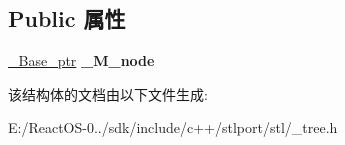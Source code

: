 \subsection*{Public 属性}
\begin{DoxyCompactItemize}
\item 
\mbox{\label{struct___rb__tree__base__iterator_a26e271e3b15ca15b2839134cb9c04bbf}} 
\hyperlink{struct___rb__tree__node__base}{\+\_\+\+Base\+\_\+ptr} {\bfseries \+\_\+\+M\+\_\+node}
\end{DoxyCompactItemize}


该结构体的文档由以下文件生成\+:\begin{DoxyCompactItemize}
\item 
E\+:/\+React\+O\+S-\/0../sdk/include/c++/stlport/stl/\+\_\+tree.\+h\end{DoxyCompactItemize}
